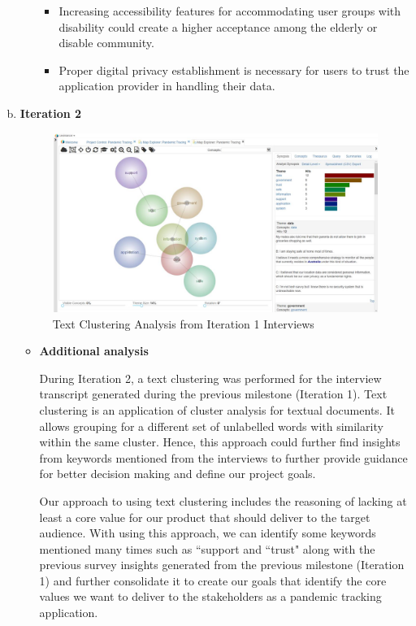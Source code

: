\begin{enumerate}[a)]
\begin{itemize}
\begin{itemize}
                \item Increasing accessibility features for accommodating user groups with disability could create a higher acceptance among the elderly or disable community.
                \item Proper digital privacy establishment is necessary for users to trust the application provider in handling their data.
              \end{itemize}
          \end{itemize}
        \item \textbf{Iteration 2}
          \begin{figure}[H]
            \centering
            \includegraphics[width=\textwidth]{img/prototype/lexi.png}
            \caption{Text Clustering Analysis from Iteration 1 Interviews}
            \label{fig:findings-2}
          \end{figure}
          \begin{itemize}
            \item \textbf{Additional analysis}
              \par During Iteration 2, a text clustering was performed for the interview transcript generated during the previous milestone (Iteration 1). Text clustering is an application of cluster analysis for textual documents. It allows grouping for a different set of unlabelled words with similarity within the same cluster. Hence, this approach could further find insights from keywords mentioned from the interviews to further provide guidance for better decision making and define our project goals.
              \par Our approach to using text clustering includes the reasoning of lacking at least a core value for our product that should deliver to the target audience. With using this approach, we can identify some keywords mentioned many times such as ``support and ``trust" along with the previous survey insights generated from the previous milestone (Iteration 1) and further consolidate it to create our goals that identify the core values we want to deliver to the stakeholders as a pandemic tracking application.

\end{itemize}
\end{enumerate}

